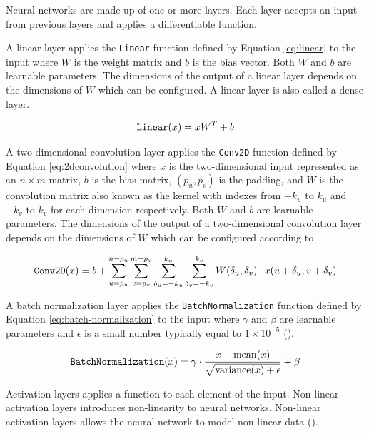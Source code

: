 
Neural networks are made up of one or more layers. Each layer accepts an input from previous layers and applies a differentiable function.

A linear layer applies the \verb|Linear| function defined by Equation \ref{eq:linear} to the input where $W$ is the weight matrix and $b$ is the bias vector. Both $W$ and $b$ are learnable parameters. The dimensions of the output of a linear layer depends on the dimensions of $W$ which can be configured. A linear layer is also called a dense layer.

\begin{equation}
    \verb|Linear|(x) = xW^T + b
    \label{eq:linear}
\end{equation}

A two-dimensional convolution layer applies the \verb|Conv2D| function defined by Equation \ref{eq:2dconvolution} where $x$ is the two-dimensional input represented as an $n \times m$ matrix, $b$ is the bias matrix, $(p_u, p_v)$ is the padding, and $W$ is the convolution matrix also known as the kernel with indexes from $-k_u$ to $k_u$ and $-k_v$ to $k_v$ for each dimension respectively. Both $W$ and $b$ are learnable parameters. The dimensions of the output of a two-dimensional convolution layer depends on the dimensions of $W$ which can be configured according to \cite{DBLP:journals/corr/OSheaN15}

\begin{equation}
    \verb|Conv2D|(x) = b + \sum_{u = p_u}^{n - p_u} \sum_{v = p_v}^{m - p_v} \sum_{\delta_u = -k_u}^{k_u} \sum_{\delta_v = -k_v}^{k_v} W(\delta_u, \delta_v) \cdot x(u + \delta_u, v + \delta_v)
    \label{eq:2dconvolution}
\end{equation}

A batch normalization layer applies the \verb|BatchNormalization| function defined by Equation \ref{eq:batch-normalization} to the input where $\gamma$ and $\beta$ are learnable parameters and $\epsilon$ is a small number typically equal to $1\times 10^{-5}$ (\cite{chollet2015keras}).

\begin{equation}
    \verb|BatchNormalization|(x) = \gamma \cdot \frac{x - \text{mean}{(x)}}{\sqrt{\text{variance}(x) + \epsilon}} + \beta
    \label{eq:batch-normalization}
\end{equation}

Activation layers applies a function to each element of the input. Non-linear activation layers introduces non-linearity to neural networks. Non-linear activation layers allows the neural network to model non-linear data (\cite{activation}).

